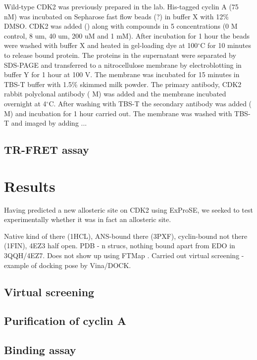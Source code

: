 Wild-type CDK2 was previously prepared in the lab.
His-tagged cyclin A (75 nM) was incubated on Sepharose fast flow beads (?) in buffer X with 12\% DMSO.
CDK2 was added () along with compounds in 5 concentrations (0 M control, 8 um, 40 um, 200 uM and 1 mM).
After incubation for 1 hour the beads were washed with buffer X and heated in gel-loading dye at 100$^{\circ}$C for 10 minutes to release bound protein.
The proteins in the supernatant were separated by SDS-PAGE and transferred to a nitrocellulose membrane by electroblotting in buffer Y for 1 hour at 100 V.
The membrane was incubated for 15 minutes in TBS-T buffer with 1.5\% skimmed milk powder.
The primary antibody, CDK2 rabbit polyclonal antibody ( M) was added and the membrane incubated overnight at 4$^{\circ}$C.
After washing with TBS-T the secondary antibody was added ( M) and incubation for 1 hour carried out.
The membrane was washed with TBS-T and imaged by adding ...


\subsection{TR-FRET assay}




\section{Results}

Having predicted a new allosteric site on CDK2 using ExProSE, we seeked to test experimentally whether it was in fact an allosteric site.

Native kind of there (1HCL), ANS-bound there (3PXF), cyclin-bound not there (1FIN), 4EZ3 half open.
PDB - n strucs, nothing bound apart from EDO in 3QQH/4EZ7.
Does not show up using FTMap \cite{Kozakov2015}.
Carried out virtual screening - example of docking pose by Vina/DOCK.


\subsection{Virtual screening}

\subsection{Purification of cyclin A}

\subsection{Binding assay}
